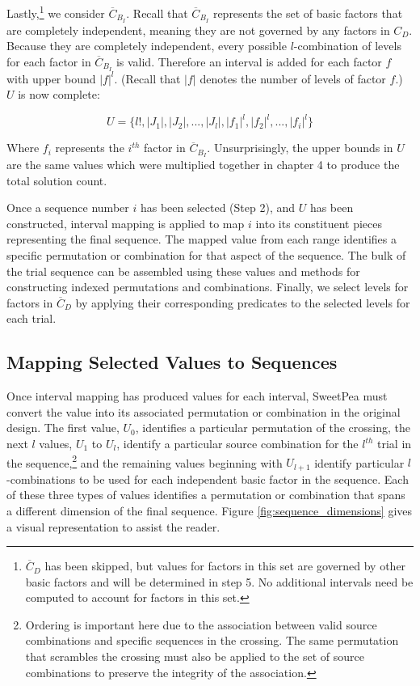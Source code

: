 Lastly,\footnote{$\overline{C}_D$ has been skipped, but values for factors in this set are governed by other basic factors and will be determined in step 5. No additional intervals need be computed to account for factors in this set.} we consider $\overline{C}_{B_I}$. Recall that $\overline{C}_{B_I}$ represents the set of basic factors that are completely independent, meaning they are not governed by any factors in $C_D$. Because they are completely independent, every possible $l$-combination of levels for each factor in $\overline{C}_{B_I}$ is valid. Therefore an interval is added for each factor $f$ with upper bound $|f|^l$. (Recall that $|f|$ denotes the number of levels of factor $f$.) $U$ is now complete:

\[
U = \{ l!, |J_1|, |J_2|, ..., |J_l|, |f_1|^l, |f_2|^l, ..., |f_i|^l\}
\]

Where $f_i$ represents the $i^{th}$ factor in $\overline{C}_{B_I}$. Unsurprisingly, the upper bounds in $U$ are the same values which were multiplied together in chapter 4 to produce the total solution count.

Once a sequence number $i$ has been selected (Step 2), and $U$ has been constructed, interval mapping is applied to map $i$ into its constituent pieces representing the final sequence. The mapped value from each range identifies a specific permutation or combination for that aspect of the sequence. The bulk of the trial sequence can be assembled using these values and methods for constructing indexed permutations and combinations. Finally, we select levels for factors in $\overline{C}_D$ by applying their corresponding predicates to the selected levels for each trial.


\subsection{Mapping Selected Values to Sequences}

Once interval mapping has produced values for each interval, SweetPea must convert the value into its associated permutation or combination in the original design. The first value, $U_0$, identifies a particular permutation of the crossing, the next $l$ values, $U_1$ to $U_l$, identify a particular source combination for the $l^{th}$ trial in the sequence,\footnote{Ordering is important here due to the association between valid source combinations and specific sequences in the crossing. The same permutation that scrambles the crossing must also be applied to the set of source combinations to preserve the integrity of the association.} and the remaining values beginning with $U_{l+1}$ identify particular $l$-combinations to be used for each independent basic factor in the sequence. Each of these three types of values identifies a permutation or combination that spans a different dimension of the final sequence. Figure \ref{fig:sequence_dimensions} gives a visual representation to assist the reader.

